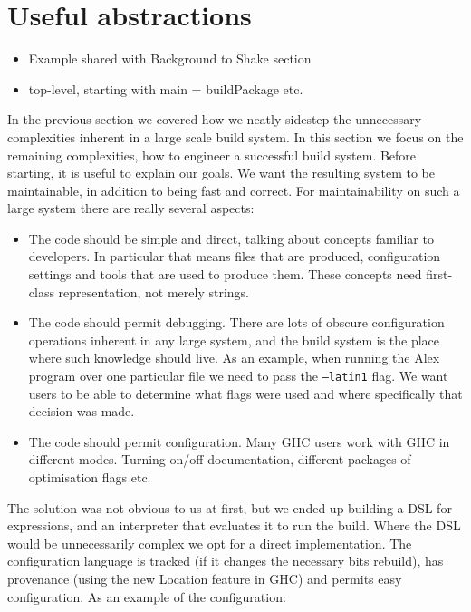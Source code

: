 \section{Useful abstractions\label{sec:abstractions}}

\begin{itemize}
  \item Example shared with Background to Shake section
  \item top-level, starting with main = buildPackage etc.
\end{itemize}

In the previous section we covered how we neatly sidestep the unnecessary
complexities inherent in a large scale build system. In this section we focus on
the remaining complexities, how to engineer a successful build system. Before
starting, it is useful to explain our goals. We want the resulting system to be
maintainable, in addition to being fast and correct. For maintainability on such
a large system there are really several aspects:

\begin{itemize}
\item The code should be simple and direct, talking about concepts familiar to developers. In particular that means files that are produced, configuration settings and tools that are used to produce them. These concepts need first-class representation, not merely strings.
\item The code should permit debugging. There are lots of obscure configuration operations inherent in any large system, and the build system is the place where such knowledge should live. As an example, when running the Alex program over one particular file we need to pass the \texttt{--latin1} flag. We want users to be able to determine what flags were used and where specifically that decision was made.
\item The code should permit configuration. Many GHC users work with GHC in different modes. Turning on/off documentation, different packages of optimisation flags etc.
\end{itemize}

The solution was not obvious to us at first, but we ended up building a DSL for expressions, and an interpreter that evaluates it to run the build. Where the DSL would be unnecessarily complex we opt for a direct implementation. The configuration language is tracked (if it changes the necessary bits rebuild), has provenance (using the new Location feature in GHC) and permits easy configuration. As an example of the configuration:


